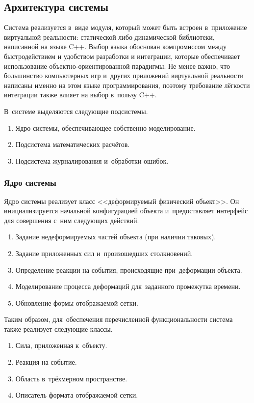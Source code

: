 \documentclass[a4paper, 14pt, titlepage]{extarticle}
\begin{document}
    \subsection{Архитектура системы}

      Система реализуется в~виде модуля, который может быть встроен в~приложение виртуальной
      реальности: статической либо динамической библиотеки, написанной на языке C++. Выбор языка
      обоснован компромиссом между быстродействием и удобством разработки и интеграции, которые
      обеспечивает использование объектно-ориентированной парадигмы. Не менее важно, что большинство
      компьютерных игр и~других приложений виртуальной реальности написаны именно на этом языке
      программирования, поэтому требование лёгкости интеграции также влияет на выбор в~пользу C++.

      В~системе выделяются следующие подсистемы.
      \begin{enumerate}
        \item Ядро системы, обеспечивающее собственно моделирование.
        \item Подсистема математических расчётов.
        \item Подсистема журналирования и~обработки ошибок.
      \end{enumerate}

      \subsubsection{Ядро системы}\label{sssec:core}

        Ядро системы реализует класс <<деформируемый физический объект>>. Он инициализируется
        начальной конфигурацией объекта и~предоставляет интерфейс для совершения с~ним следующих действий.
        \begin{enumerate}
          \item Задание недеформируемых частей объекта (при наличии таковых).
          \item Задание приложенных сил и~произошедших столкновений.
          \item Определение реакции на события, происходящие при~деформации объекта.
          \item Моделирование процесса деформаций для~заданного промежутка времени.
          \item Обновление формы отображаемой сетки.
        \end{enumerate}

        Таким образом, для~обеспечения перечисленной функциональности система также реализует следующие классы.
        \begin{enumerate}
          \item Сила, приложенная к~объекту.
          \item Реакция на событие.
          \item Область в~трёхмерном пространстве.
          \item Описатель формата отображаемой сетки.
        \end{enumerate}
\end{document}
